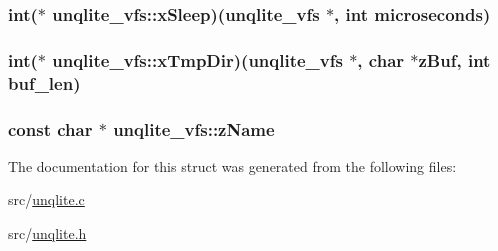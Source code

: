 \hypertarget{structunqlite__vfs_a3d7d751cb9284864ba562a4ef395510e}{
\subsubsection[{x\-Sleep}]{\setlength{\rightskip}{0pt plus 5cm}int($\ast$ unqlite\-\_\-vfs\-::x\-Sleep)({\bf unqlite\-\_\-vfs} $\ast$, int microseconds)}}\label{d5/d07/structunqlite__vfs_a3d7d751cb9284864ba562a4ef395510e}
\hypertarget{structunqlite__vfs_ad525dc6f3ca0b990fbccabdc5588ebcf}{
\subsubsection[{x\-Tmp\-Dir}]{\setlength{\rightskip}{0pt plus 5cm}int($\ast$ unqlite\-\_\-vfs\-::x\-Tmp\-Dir)({\bf unqlite\-\_\-vfs} $\ast$, char $\ast$z\-Buf, int buf\-\_\-len)}}\label{d5/d07/structunqlite__vfs_ad525dc6f3ca0b990fbccabdc5588ebcf}
\hypertarget{structunqlite__vfs_a6408d31a9666612a52fd8248fcc09c15}{
\subsubsection[{z\-Name}]{\setlength{\rightskip}{0pt plus 5cm}const char $\ast$ unqlite\-\_\-vfs\-::z\-Name}}\label{d5/d07/structunqlite__vfs_a6408d31a9666612a52fd8248fcc09c15}


The documentation for this struct was generated from the following files\-:\begin{DoxyCompactItemize}
\item 
src/\hyperlink{unqlite_8c}{unqlite.\-c}\item 
src/\hyperlink{unqlite_8h}{unqlite.\-h}\end{DoxyCompactItemize}
